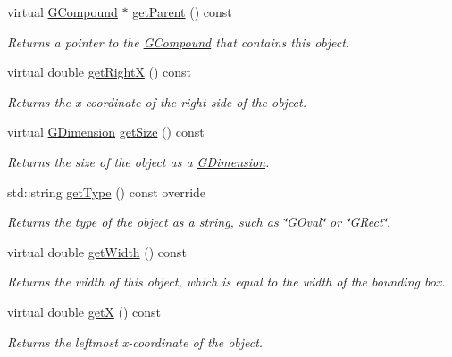 \begin{DoxyCompactItemize}
virtual \mbox{\hyperlink{classsgl_1_1GCompound}{G\+Compound}} $\ast$ \mbox{\hyperlink{classsgl_1_1GObject_a3e53cef70541b1a14eade4ad0984d0b4}{get\+Parent}} () const
\begin{DoxyCompactList}\small\item\em Returns a pointer to the {\ttfamily \mbox{\hyperlink{classsgl_1_1GCompound}{G\+Compound}}} that contains this object. \end{DoxyCompactList}\item 
virtual double \mbox{\hyperlink{classsgl_1_1GObject_a798cc79daaa10145b28f60bcdfdb0ee9}{get\+RightX}} () const
\begin{DoxyCompactList}\small\item\em Returns the {\itshape x}-\/coordinate of the right side of the object. \end{DoxyCompactList}\item 
virtual \mbox{\hyperlink{structsgl_1_1GDimension}{G\+Dimension}} \mbox{\hyperlink{classsgl_1_1GObject_a7b4eec96a2bdc6420695d5796a78eea9}{get\+Size}} () const
\begin{DoxyCompactList}\small\item\em Returns the size of the object as a {\ttfamily \mbox{\hyperlink{structsgl_1_1GDimension}{G\+Dimension}}}. \end{DoxyCompactList}\item 
std\+::string \mbox{\hyperlink{classsgl_1_1GRoundRect_a9b72ede4ee8520f987a0c01e30654814}{get\+Type}} () const override
\begin{DoxyCompactList}\small\item\em Returns the type of the object as a string, such as {\ttfamily \char`\"{}\+G\+Oval\char`\"{}} or {\ttfamily \char`\"{}\+G\+Rect\char`\"{}}. \end{DoxyCompactList}\item 
virtual double \mbox{\hyperlink{classsgl_1_1GObject_a0ed2965abd4f5701d2cadf71239faf19}{get\+Width}} () const
\begin{DoxyCompactList}\small\item\em Returns the width of this object, which is equal to the width of the bounding box. \end{DoxyCompactList}\item 
virtual double \mbox{\hyperlink{classsgl_1_1GObject_a344385751bee0720059403940d57a13e}{getX}} () const
\begin{DoxyCompactList}\small\item\em Returns the leftmost {\itshape x}-\/coordinate of the object. \end{DoxyCompactList}\item 

\end{DoxyCompactItemize}
